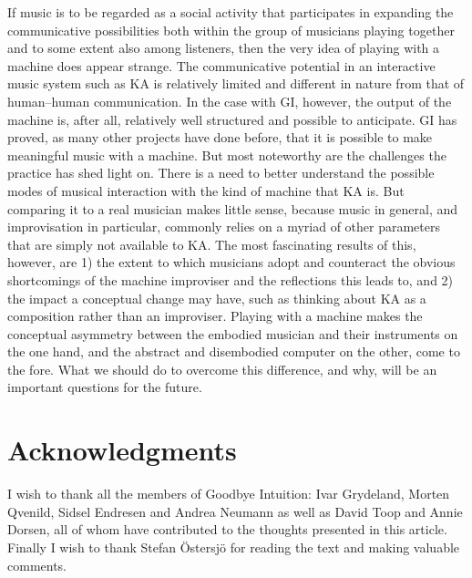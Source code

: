 \documentclass[11pt]{article}
\begin{document}
If music is to be regarded as a social activity that participates in
expanding the communicative possibilities both within the group of
musicians playing together and to some extent also among listeners,
then the very idea of playing with a machine does appear strange. The
communicative potential in an interactive music system such as KA is
relatively limited and different in nature from that of human--human
communication. In the case with GI, however, the output of the machine
is, after all, relatively well structured and possible to
anticipate. GI has proved, as many other projects have done before,
that it is possible to make meaningful music with a machine. But most
noteworthy are the challenges the practice has shed light on. There is
a need to better understand the possible modes of musical interaction
with the kind of machine that KA is. But comparing it to a real
musician makes little sense, because music in general, and
improvisation in particular, commonly relies on a myriad of other
parameters that are simply not available to KA. The most fascinating
results of this, however, are 1) the extent to which musicians adopt
and counteract the obvious shortcomings of the machine improviser and
the reflections this leads to, and 2) the impact a conceptual change
may have, such as thinking about KA as a composition rather than an
improviser. Playing with a machine makes the conceptual asymmetry
between the embodied musician and their instruments on the one hand,
and the abstract and disembodied computer on the other, come to the
fore. What we should do to overcome this difference, and why, will be
an important questions for the future.

\section*{Acknowledgments}
\label{sec:org9374948}
I wish to thank all the members of Goodbye Intuition: Ivar Grydeland,
Morten Qvenild, Sidsel Endresen and Andrea Neumann as well as David
Toop and Annie Dorsen, all of whom have contributed to the thoughts
presented in this article. Finally I wish to thank Stefan Östersjö for
reading the text and making valuable comments.

\label{sec:orgce11cbb}
\printbibliography
\end{document}
